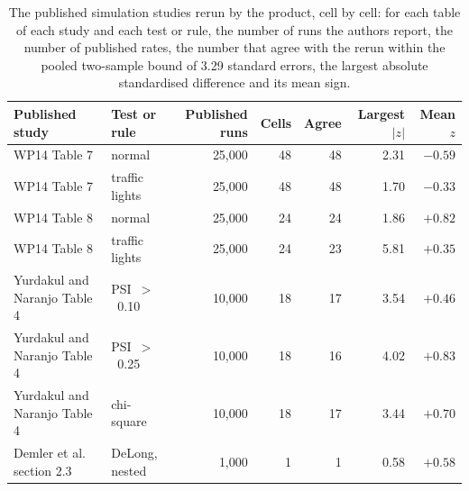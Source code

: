\begin{table}[htbp]
\centering
\setlength{\tabcolsep}{3pt}
\footnotesize
\caption{The published simulation studies rerun by the product, cell by cell: for each table of each study and each test or rule, the number of runs the authors report, the number of published rates, the number that agree with the rerun within the pooled two-sample bound of 3.29 standard errors, the largest absolute standardised difference and its mean sign.}
\label{tab:vt-published}
\begin{tabular}{llrrrrr}
\toprule
Published study & Test or rule & Published runs & Cells & Agree & Largest $|z|$ & Mean $z$ \\
\midrule
WP14 Table 7 & normal & 25,000 & 48 & 48 & 2.31 & $-0.59$ \\
WP14 Table 7 & traffic lights & 25,000 & 48 & 48 & 1.70 & $-0.33$ \\
WP14 Table 8 & normal & 25,000 & 24 & 24 & 1.86 & $+0.82$ \\
WP14 Table 8 & traffic lights & 25,000 & 24 & 23 & 5.81 & $+0.35$ \\
Yurdakul and Naranjo Table 4 & \mbox{PSI }$>$\mbox{ 0.10} & 10,000 & 18 & 17 & 3.54 & $+0.46$ \\
Yurdakul and Naranjo Table 4 & \mbox{PSI }$>$\mbox{ 0.25} & 10,000 & 18 & 16 & 4.02 & $+0.83$ \\
Yurdakul and Naranjo Table 4 & \mbox{chi-square} & 10,000 & 18 & 17 & 3.44 & $+0.70$ \\
Demler et al. section 2.3 & DeLong, nested & 1,000 & 1 & 1 & 0.58 & $+0.58$ \\
\bottomrule
\end{tabular}
\end{table}
